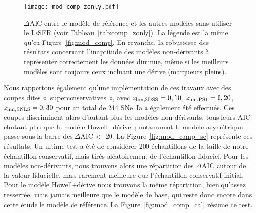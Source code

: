 \documentclass[../main/main.tex]{subfiles}
\begin{document}
\begin{SCfigure}[0.8][h!]
    \texttt{[image: mod\_comp\_zonly.pdf]}
    \caption[$\Delta$AIC entre le modèle de base et les autres modèles sans
    utiliser le LsSFR]{$\Delta$AIC entre le modèle de référence et les autres
        modèles sans utiliser le LsSFR (voir Tableau~\ref{tab:comp_zonly}). La
        légende est la même qu'en Figure~\ref{fig:mod_comp}. En revanche, la
        robustesse des résultats concernant l'inaptitude des modèles
        non-dérivants à représenter correctement les données diminue, même si
        les meilleurs modèles sont toujours ceux incluant une dérive (marqueurs
    pleins).}\label{fig:mod_comp_zonly}
\end{SCfigure}

Nous rapportons également qu'une implémentation de ces travaux avec des coupes
dites «~superconservatives~», avec $z_{\rm lim, SDSS} = 0,10$, $z_{\rm lim, PS1}
= 0,20$, $z_{\rm lim, SNLS} = 0,30$ pour un total de 244 SNe~Ia a également été
effectuée. Ces coupes discriminent alors d'autant plus les modèles
non-dérivants, tous leurs AIC chutant plus que le modèle Howell+dérive~;
notamment le modèle asymétrique passe sous la barre des $\Delta$AIC < -20. La
Figure~\ref{fig:mod_comp_sc} représente ces résultats. Un ultime test a été de
considérer 200 échantillons de la taille de notre échantillon conservatif, mais
tirés aléatoirement de l'échantillon fiduciel. Pour les modèles non-dérivants,
nous trouvons alors une répartition des $\Delta$AIC autour de la valeur
fiducielle, mais rarement meilleure que l'échantillon conservatif initial. Pour
le modèle Howell+dérive nous trouvons la même répartition, bien qu'assez
resserrée, mais jamais meilleure que le modèle de base, qui reste donc encore
dans cette étude le modèle de référence. La Figure~\ref{fig:mod_comp_cal} résume
ce test.
\end{document}
